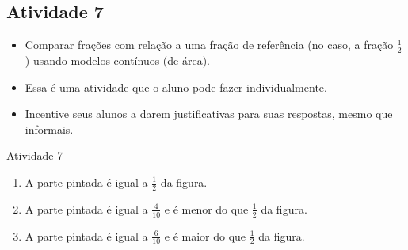 \newpage
\begin{multicols}{2}
\subsection{Atividade 7}

  \vspace{.1cm}

\begin{itemize} %
    \item       Comparar frações com relação a uma fração de referência (no caso, a fração       $\frac{1}{2}$) usando modelos contínuos (de área).
\end{itemize} %


  \vspace{.1cm}

  \vspace{.1cm}

  \begin{itemize} %
    \item       Essa é uma atividade que o aluno pode fazer individualmente.
    \item       Incentive seus alunos a darem justificativas para suas respostas, mesmo que informais.
\end{itemize} %


  \vspace{.1cm}


\begin{resposta*}{Atividade 7}
\begin{enumerate} [\quad a)] %
    \item       A parte pintada é igual a       $\frac{1}{2}$ da figura.
    \item       A parte pintada é igual a       $\frac{4}{10}$ e é menor do que       $\frac{1}{2}$ da figura.
    \item       A parte pintada é igual a       $\frac{6}{10}$ e é maior do que       $\frac{1}{2}$ da figura.
\end{enumerate} %


\end{resposta*}
\end{multicols}
